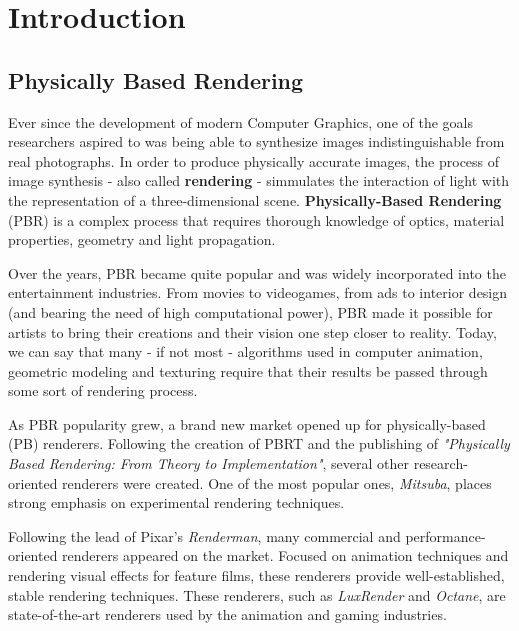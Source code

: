 \documentclass[cic,tc,english]{iiufrgs}
\begin{document}

\tableofcontents

\chapter{Introduction}
\section{Physically Based Rendering}
Ever since the development of modern Computer Graphics, one of the goals 
researchers aspired to was being able to synthesize images indistinguishable 
from real photographs. In order to produce physically accurate images, the 
process of image synthesis - also called \textbf{rendering} - simmulates the 
interaction of light with the representation of a three-dimensional scene. 
\textbf{Physically-Based Rendering} (PBR) is a complex process that requires 
thorough knowledge of optics, material properties, geometry and light 
propagation.

Over the years, PBR became quite popular and was widely incorporated into the 
entertainment industries. From movies to videogames, from ads to interior 
design (and bearing the need of high computational power), PBR made it possible 
for artists to bring their creations and their vision one step closer to 
reality. Today, we can say that many - if not most - algorithms used in 
computer animation, geometric modeling and texturing require that their results 
be passed through some sort of rendering process. 

As PBR popularity grew, a brand new market opened up for physically-based (PB) 
renderers. Following the creation of PBRT and the publishing of 
\textit{"Physically Based Rendering: From Theory to Implementation"},
several other research-oriented renderers were created. One of the most popular 
ones, \textit{Mitsuba}, places strong emphasis on experimental rendering 
techniques.

Following the lead of Pixar's \textit{Renderman}, many commercial and 
performance-oriented renderers appeared on the market. Focused on animation 
techniques and rendering visual effects for feature films, these renderers
provide well-established, stable rendering techniques. These renderers, such as 
\textit{LuxRender} and \textit{Octane}, are state-of-the-art renderers used by 
the animation and gaming industries.
\end{document}

